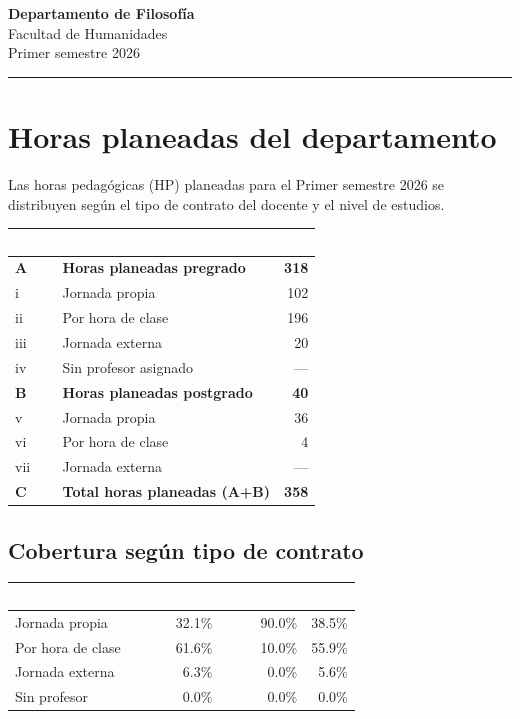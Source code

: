\documentclass[11pt, a4paper]{article}
\begin{document}
\begin{center}
  {\Large\bfseries\color{usachDark} Departamento de Filosofía} \\[0.4em]
  {\large\color{usachTeal} Facultad de Humanidades} \\[0.2em]
  {\normalsize\color{gray} Primer semestre 2026}
\end{center}
\vspace{0.5em}
\textcolor{usachTeal}{\rule{\linewidth}{2pt}}
\vspace{1em}

\section{Horas planeadas del departamento}

Las horas pedagógicas (HP) planeadas para el Primer semestre 2026 se distribuyen según el tipo de contrato del docente y el nivel de estudios.

\begin{tabularx}{\linewidth}{l X r}
\toprule
\rowcolor{usachDark} \textbf{\textcolor{white}{Cód.}} & \textbf{\textcolor{white}{Descripción}} & \textbf{\textcolor{white}{HP}} \\
\midrule
\rowcolor{rowHighlight}\textbf{A} & \textbf{Horas planeadas pregrado} & \textbf{318} \\
\rowcolor{rowEven}i & Jornada propia & 102 \\
ii & Por hora de clase & 196 \\
\rowcolor{rowEven}iii & Jornada externa & 20 \\
iv & Sin profesor asignado & --- \\
\rowcolor{rowHighlight}\textbf{B} & \textbf{Horas planeadas postgrado} & \textbf{40} \\
v & Jornada propia & 36 \\
\rowcolor{rowEven}vi & Por hora de clase & 4 \\
vii & Jornada externa & --- \\
\rowcolor{rowHighlight}\textbf{C} & \textbf{Total horas planeadas (A+B)} & \textbf{358} \\
\bottomrule
\end{tabularx}

\subsection{Cobertura según tipo de contrato}

\begin{tabular}{lrrr}
\toprule
\rowcolor{usachDark} \textbf{\textcolor{white}{Tipo de contrato}} & \textbf{\textcolor{white}{Pregrado}} & \textbf{\textcolor{white}{Postgrado}} & \textbf{\textcolor{white}{Total}} \\
\midrule
Jornada propia & 32.1\% & 90.0\% & 38.5\% \\
\rowcolor{rowEven}Por hora de clase & 61.6\% & 10.0\% & 55.9\% \\
Jornada externa & 6.3\% & 0.0\% & 5.6\% \\
\rowcolor{rowEven}Sin profesor & 0.0\% & 0.0\% & 0.0\% \\
\bottomrule
\end{tabular}
\end{document}
